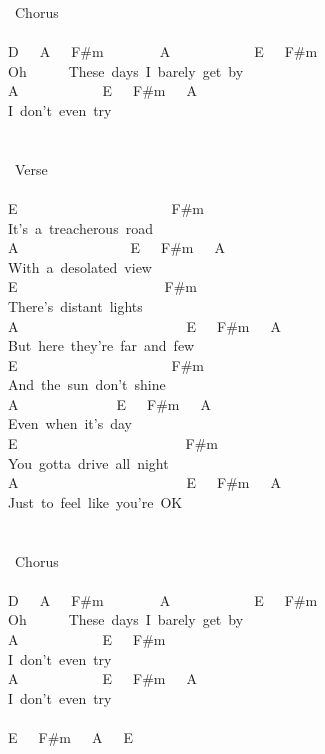 {\lbrack\ Chorus\rbrack\\
\\
D\ \ \ A\ \ \ F\#m\ \ \ \ \ \ \ \ A\ \ \ \ \ \ \ \ \ \ \ \ E\ \ \ F\#m\\
Oh\ \ \ \ \ \ These\ days\ I\ barely\ get\ by\\
A\ \ \ \ \ \ \ \ \ \ \ \ E\ \ \ F\#m\ \ \ A\\
I\ don't\ even\ try\\
\\
\\
\lbrack\ Verse\rbrack\\
\\
E\ \ \ \ \ \ \ \ \ \ \ \ \ \ \ \ \ \ \ \ \ \ F\#m\\
It's\ a\ treacherous\ road\\
A\ \ \ \ \ \ \ \ \ \ \ \ \ \ \ \ E\ \ \ F\#m\ \ \ A\\
With\ a\ desolated\ view\\
E\ \ \ \ \ \ \ \ \ \ \ \ \ \ \ \ \ \ \ \ \ F\#m\\
There's\ distant\ lights\\
A\ \ \ \ \ \ \ \ \ \ \ \ \ \ \ \ \ \ \ \ \ \ \ \ E\ \ \ F\#m\ \ \ A\\
But\ here\ they're\ far\ and\ few\\
E\ \ \ \ \ \ \ \ \ \ \ \ \ \ \ \ \ \ \ \ \ \ F\#m\\
And\ the\ sun\ don't\ shine\\
A\ \ \ \ \ \ \ \ \ \ \ \ \ \ E\ \ \ F\#m\ \ \ A\\
Even\ when\ it's\ day\\
E\ \ \ \ \ \ \ \ \ \ \ \ \ \ \ \ \ \ \ \ \ \ \ \ F\#m\\
You\ gotta\ drive\ all\ night\\
A\ \ \ \ \ \ \ \ \ \ \ \ \ \ \ \ \ \ \ \ \ \ \ \ E\ \ \ F\#m\ \ \ A\\
Just\ to\ feel\ like\ you're\ OK\\
\\
\\
\lbrack\ Chorus\rbrack\\
\\
D\ \ \ A\ \ \ F\#m\ \ \ \ \ \ \ \ A\ \ \ \ \ \ \ \ \ \ \ \ E\ \ \ F\#m\\
Oh\ \ \ \ \ \ These\ days\ I\ barely\ get\ by\\
A\ \ \ \ \ \ \ \ \ \ \ \ E\ \ \ F\#m\\
I\ don't\ even\ try\\
A\ \ \ \ \ \ \ \ \ \ \ \ E\ \ \ F\#m\ \ \ A\\
I\ don't\ even\ try\\
\\
E\ \ \ F\#m\ \ \ A\ \ \ E\ }
